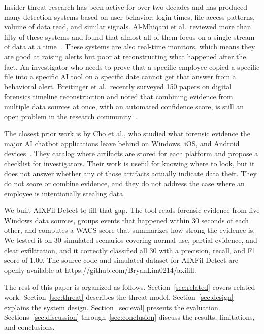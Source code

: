 \documentclass[conference]{IEEEtran}
\begin{document}
Insider threat research has been active for over two decades and has
produced many detection systems based on user behavior: login times,
file access patterns, volume of data read, and similar signals.
Al-Mhiqani et al.\ reviewed more than fifty of these systems and found
that almost all of them focus on a single stream of data at a
time~\cite{almhiqani2020review}. These systems are also real-time
monitors, which means they are good at raising alerts but poor at
reconstructing what happened after the fact. An investigator who needs
to prove that a specific employee copied a specific file into a specific
AI tool on a specific date cannot get that answer from a behavioral
alert. Breitinger et al.\ recently surveyed 150 papers on digital
forensics timeline reconstruction and noted that combining evidence from
multiple data sources at once, with an automated confidence score, is
still an open problem in the research community~\cite{breitinger2025sok}.

The closest prior work is by Cho et al., who studied what forensic
evidence the major AI chatbot applications leave behind on Windows,
iOS, and Android devices~\cite{cho2025conversational}. They catalog
where artifacts are stored for each platform and propose a checklist
for investigators. Their work is useful for knowing where to look, but
it does not answer whether any of those artifacts actually indicate
data theft. They do not score or combine evidence, and they do not
address the case where an employee is intentionally stealing data.

We built AIXFil-Detect to fill that gap. The tool reads forensic
evidence from five Windows data sources, groups events that happened
within 30 seconds of each other, and computes a WACS score that
summarizes how strong the evidence is. We tested it on 30 simulated
scenarios covering normal use, partial evidence, and clear exfiltration,
and it correctly classified all 30 with a precision, recall, and F1
score of 1.00. The source code and simulated dataset for AIXFil-Detect are openly available at \url{https://github.com/BryanLim0214/axifill}.

The rest of this paper is organized as follows. Section~\ref{sec:related}
covers related work. Section~\ref{sec:threat} describes the threat
model. Section~\ref{sec:design} explains the system design.
Section~\ref{sec:eval} presents the evaluation. Sections~\ref{sec:discussion}
through~\ref{sec:conclusion} discuss the results, limitations, and
conclusions.

\end{document}
